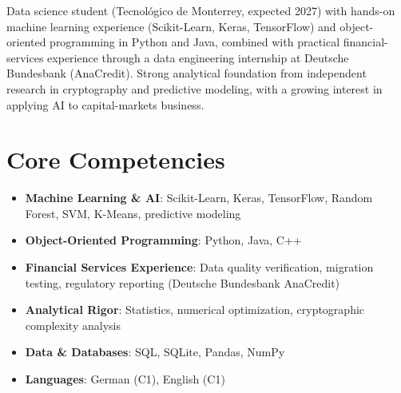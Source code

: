 \documentclass[11pt,a4paper,sans]{moderncv}
\begin{document}
\makecvtitle


\vspace{6pt}
\small{Data science student (Tecnológico de Monterrey, expected 2027) with hands-on machine learning experience (Scikit-Learn, Keras, TensorFlow) and object-oriented programming in Python and Java, combined with practical financial-services experience through a data engineering internship at Deutsche Bundesbank (AnaCredit). Strong analytical foundation from independent research in cryptography and predictive modeling, with a growing interest in applying AI to capital-markets business.}


\section{Core Competencies}
\vspace{1pt}
\begin{itemize}

\item \textbf{Machine Learning \& AI}: Scikit-Learn, Keras, TensorFlow, Random Forest, SVM, K-Means, predictive modeling

\item \textbf{Object-Oriented Programming}: Python, Java, C++

\item \textbf{Financial Services Experience}: Data quality verification, migration testing, regulatory reporting (Deutsche Bundesbank AnaCredit)

\item \textbf{Analytical Rigor}: Statistics, numerical optimization, cryptographic complexity analysis

\item \textbf{Data \& Databases}: SQL, SQLite, Pandas, NumPy

\item \textbf{Languages}: German (C1), English (C1)

\end{itemize}

\end{document}
